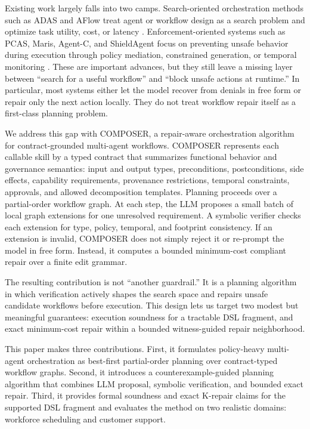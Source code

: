 \documentclass[11pt]{article}
\begin{document}
Existing work largely falls into two camps. Search-oriented orchestration methods such as ADAS and AFlow treat agent or workflow design as a search problem and optimize task utility, cost, or latency \citep{ADAS,AFlow}. Enforcement-oriented systems such as PCAS, Maris, Agent-C, and ShieldAgent focus on preventing unsafe behavior during execution through policy mediation, constrained generation, or temporal monitoring \citep{PCAS,Maris,Agent-C,ShieldAgent}. These are important advances, but they still leave a missing layer between ``search for a useful workflow'' and ``block unsafe actions at runtime.'' In particular, most systems either let the model recover from denials in free form or repair only the next action locally. They do not treat workflow repair itself as a first-class planning problem.

We address this gap with COMPOSER, a repair-aware orchestration algorithm for contract-grounded multi-agent workflows. COMPOSER represents each callable skill by a typed contract that summarizes functional behavior and governance semantics: input and output types, preconditions, postconditions, side effects, capability requirements, provenance restrictions, temporal constraints, approvals, and allowed decomposition templates. Planning proceeds over a partial-order workflow graph. At each step, the LLM proposes a small batch of local graph extensions for one unresolved requirement. A symbolic verifier checks each extension for type, policy, temporal, and footprint consistency. If an extension is invalid, COMPOSER does not simply reject it or re-prompt the model in free form. Instead, it computes a bounded minimum-cost compliant repair over a finite edit grammar.

The resulting contribution is not ``another guardrail.'' It is a planning algorithm in which verification actively shapes the search space and repairs unsafe candidate workflows before execution. This design lets us target two modest but meaningful guarantees: execution soundness for a tractable DSL fragment, and exact minimum-cost repair within a bounded witness-guided repair neighborhood.

This paper makes three contributions. First, it formulates policy-heavy multi-agent orchestration as best-first partial-order planning over contract-typed workflow graphs. Second, it introduces a counterexample-guided planning algorithm that combines LLM proposal, symbolic verification, and bounded exact repair. Third, it provides formal soundness and exact K-repair claims for the supported DSL fragment and evaluates the method on two realistic domains: workforce scheduling and customer support.
\end{document}
